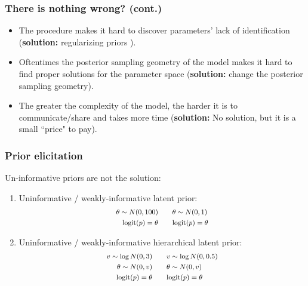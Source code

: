\documentclass[arial,12pt,xcolor=dvipsnames]{beamer}
\begin{document}
%
\begin{frame}
	\frametitle{There is nothing wrong? (cont.)}
	\begin{itemize}
		\item The procedure makes it hard to discover parameters' lack of identification \cite{Skrondal_et_al_2004a} (\textbf{solution:} regularizing priors ).
		\item Oftentimes the posterior sampling geometry of the model makes it hard to find proper solutions for the parameter space \cite{Betancourt_et_al_2013} (\textbf{solution:} change the posterior sampling geometry).
		\item The greater the complexity of the model, the harder it is to communicate/share and takes more time
		(\textbf{solution:} No solution, but it is a small ``price" to pay).
	\end{itemize}
\end{frame}
%
\begin{frame}
	\frametitle{Prior elicitation}
	Un-informative priors are not the solution:
	\begin{enumerate}
		\item Uninformative / weakly-informative latent prior:
		\begin{equation*} \label{eq:prior_el1}
			\footnotesize
			\begin{split}	
				\theta \sim N(0, 100) \quad & \quad \theta \sim N(0, 1) \\
				\text{logit}(p) = \theta \quad & \quad \text{logit}(p) = \theta
			\end{split}
		\end{equation*}
		\item Uninformative / weakly-informative hierarchical latent prior:
		\begin{equation*} \label{eq:prior_el2}
			\footnotesize
			\begin{split}
				v \sim \log N(0, 3) \quad & \quad v \sim \log N(0, 0.5) \\	
				\theta \sim N(0, v) \quad & \quad \theta \sim N(0, v) \\
				\text{logit}(p) = \theta \quad & \quad \text{logit}(p) = \theta
			\end{split}
		\end{equation*}
	\end{enumerate}
\end{frame}
%
\end{document}
